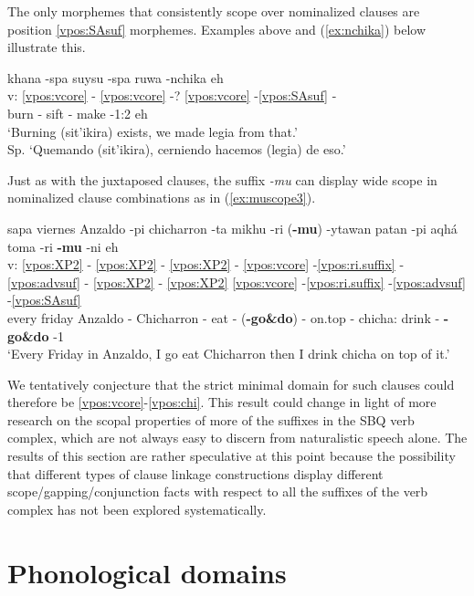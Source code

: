 \documentclass[output=paper]{langscibook}
\begin{document}
The only morphemes that consistently scope over nominalized clauses are position \ref{vpos:SAsuf} morphemes. Examples above and (\ref{ex:nchika}) below illustrate this.
  
\ea \label{ex:nchika}
    \glll{} khana -spa suysu -spa ruwa -nchika eh \\
    v: \ref{vpos:vcore} - \ref{vpos:vcore} -? \ref{vpos:vcore} -\ref{vpos:SAsuf} - \\
    {} burn -\Gerund{} sift -\Gerund{} make -1:2\Pl{} eh \\ 
    \glt  `Burning (sit'ikira) exists, we made legia from that.'  \\ Sp. `Quemando (sit'ikira), cerniendo hacemos (legia) de eso.' 
\z 

Just as with the juxtaposed clauses, the suffix \textit{-mu} can display wide scope in nominalized clause combinations as in (\ref{ex:muscope3}).

\ea \label{ex:muscope3}
    \glll{} sapa viernes Anzaldo -pi chicharron -ta mikhu -ri (\textbf{-mu}) -ytawan patan -pi aqhá toma -ri \textbf{-mu} -ni eh \\
    v: \ref{vpos:XP2} - \ref{vpos:XP2} - \ref{vpos:XP2} - \ref{vpos:vcore} -\ref{vpos:ri.suffix} -\ref{vpos:advsuf} - \ref{vpos:XP2} - \ref{vpos:XP2} \ref{vpos:vcore} -\ref{vpos:ri.suffix} -\ref{vpos:advsuf} -\ref{vpos:SAsuf} \\
    {} every friday Anzaldo -\Loc{} Chicharron -\Acc{} eat -\Aff{} (\textbf{-go\&do}) -\Acc{} on.top -\Loc{} chicha:\Acc{} drink -\Aff{} \textbf{-go\&do} -1\Sg{}  \\
    \glt `Every Friday in Anzaldo, I go eat Chicharron then I drink chicha on top of it.'
\z

We tentatively conjecture that the strict minimal domain for such clauses could therefore be \ref{vpos:vcore}-\ref{vpos:chi}. This result could change in light of more research on the scopal properties of more of the suffixes in the SBQ verb complex, which are not always easy to discern from naturalistic speech alone. The results of this section are rather speculative at this point because the possibility that different types of clause linkage constructions display different scope/gapping/conjunction facts with respect to all the suffixes of the verb complex has not been explored systematically. 

\section{Phonological domains} %
\label{sbq:sec:phonologicaldomains}
\end{document}

